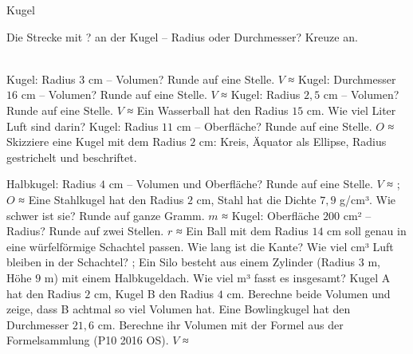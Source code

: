 \setcounter{aufgabe}{20}

\begin{aufgabe}{Kugel}
\begin{teile}
\teil Die Strecke mit ? an der Kugel – Radius oder Durchmesser? Kreuze an.\\ \\ 

\teil Kugel: Radius $3$ cm – Volumen? Runde auf eine Stelle. $V$ ≈ \leerfeld[cm³]
\teil Kugel: Durchmesser $16$ cm – Volumen? Runde auf eine Stelle. $V$ ≈ \leerfeld[cm³]
\teil Kugel: Radius $2{,}5$ cm – Volumen? Runde auf eine Stelle. $V$ ≈ \leerfeld[cm³]
\teil Ein Wasserball hat den Radius $15$ cm. Wie viel Liter Luft sind darin? \leerfeld[l]
\teil Kugel: Radius $11$ cm – Oberfläche? Runde auf eine Stelle. $O$ ≈ \leerfeld[cm²]
\teil Skizziere eine Kugel mit dem Radius $2$ cm: Kreis, Äquator als Ellipse, Radius gestrichelt und beschriftet.

\teil Halbkugel: Radius $4$ cm – Volumen und Oberfläche? Runde auf eine Stelle. $V$ ≈ \leerfeld[cm³] ; $O$ ≈ \leerfeld[cm²]
\teil Eine Stahlkugel hat den Radius $2$ cm, Stahl hat die Dichte $7{,}9$ g/cm³. Wie schwer ist sie? Runde auf ganze Gramm. $m$ ≈ \leerfeld[g]
\teil Kugel: Oberfläche $200$ cm² – Radius? Runde auf zwei Stellen. $r$ ≈ \leerfeld[cm]
\teil Ein Ball mit dem Radius $14$ cm soll genau in eine würfelförmige Schachtel passen. Wie lang ist die Kante? Wie viel cm³ Luft bleiben in der Schachtel? \leerfeld[cm] ; \leerfeld[cm³]
\teil Ein Silo besteht aus einem Zylinder (Radius $3$ m, Höhe $9$ m) mit einem Halbkugeldach. Wie viel m³ fasst es insgesamt? \leerfeld[m³]
\teil Kugel A hat den Radius $2$ cm, Kugel B den Radius $4$ cm. Berechne beide Volumen und zeige, dass B achtmal so viel Volumen hat.
\teil Eine Bowlingkugel hat den Durchmesser $21{,}6$ cm. Berechne ihr Volumen mit der Formel aus der Formelsammlung \hfill (P10 2016 OS). $V$ ≈ \leerfeld[cm³]
\end{teile}
\end{aufgabe}

